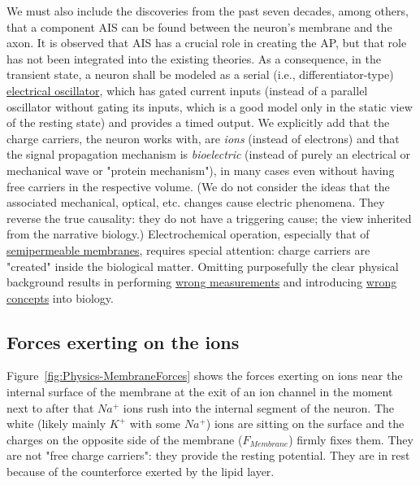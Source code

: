 We must also include the discoveries from the past seven decades,
among others, that a component \gls{AIS} can be found between the neuron's membrane and the axon. It is observed that \gls{AIS} has a crucial role in creating the \gls{AP}, but
that role has not been integrated into the existing theories.
As a consequence, in the transient state, a neuron shall be modeled
as a serial (i.e., differentiator-type) \hyperlink{PhysicsOscillator}
{electrical oscillator}, which has gated current 
inputs (instead of a parallel oscillator 
without gating its inputs, which is a good model only in the static view of the resting state) and provides a timed output. We explicitly add that the charge carriers, the neuron 
works with, are \textit{ions} (instead of electrons) and that the signal propagation
mechanism is \textit{bioelectric} (instead of purely an electrical
or mechanical wave or "protein mechanism"), in many cases even without having free carriers in the respective volume. (We do not consider the
ideas that the associated mechanical, optical, etc. changes cause electric phenomena. They reverse the true causality: they do not have 
a triggering cause; the view inherited from the narrative biology.)
Electrochemical operation,
especially that of \hyperlink{ThermodynamicElectricField}{semipermeable membranes}, requires special attention: 
charge carriers are "created" inside the biological matter.
Omitting purposefully the clear physical background results in performing
\hyperlink{voltage-clamping}{wrong measurements} and introducing \hyperlink{PhysiologyFallacy}{wrong concepts} into biology.


\subsection[Forces]{Forces exerting on the ions\label{sec:Physics-ForcesMembrane}}
Figure~\ref{fig:Physics-MembraneForces} shows the forces exerting on ions 
near the internal surface of the membrane 
at the exit of an ion channel
in the moment next to after that
$Na^+$ ions rush into the internal segment of the neuron.
The white (likely mainly $K^+$ with some $Na^+$) ions are sitting on the surface and the charges on the opposite side of the membrane ($F_{Membrane}$) firmly fixes them. They are not "free charge carriers": they provide the resting potential. They are in rest because of the counterforce exerted by the 
lipid layer.


